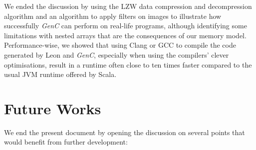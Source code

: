 \documentclass[a4paper,twoside]{article}
\let\oldsection\section
\renewcommand\section{\cleardoublepage\oldsection}
\newcommand{\GenC}{\emph{GenC}\xspace}
\begin{document}
We ended the discussion by using the LZW data compression and decompression
algorithm and an algorithm to apply filters on images to illustrate how
successfully \GenC can perform on real-life programs, although identifying some
limitations with nested arrays that are the consequences of our memory model.
Performance-wise, we showed that using Clang or GCC to compile the code
generated by Leon and \GenC, especially when using the compilers' clever
optimisations, result in a runtime often close to ten times faster compared to
the usual JVM runtime offered by Scala.


\section{Future Works}
\label{future_works}

We end the present document by opening the discussion on several points that
would benefit from further development:
\end{document}
